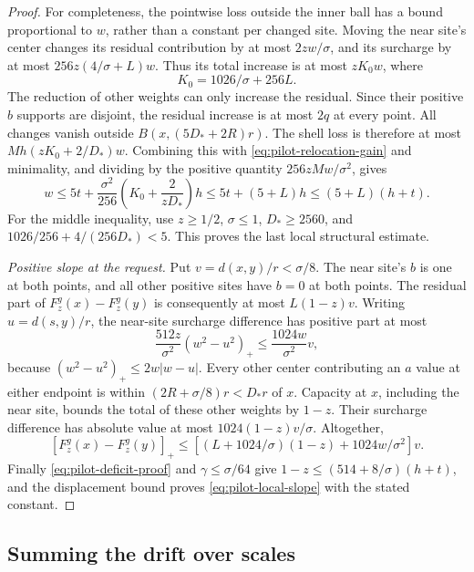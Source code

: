 \begin{proof}
For completeness, the pointwise loss outside the inner ball has a
bound proportional to $w$, rather than a constant per changed site.
Moving the near site's center changes its residual contribution by at
most $2zw/\sigma$, and its surcharge by at most
$256z(4/\sigma+L)w$.  Thus its total increase is at most $zK_0w$, where
\[
 K_0=1026/\sigma+256L.
\]
The reduction of other weights can only increase the residual.  Since
their positive $b$ supports are disjoint, the residual increase is at
most $2q$ at every point.  All changes vanish outside
$B(x,(5D_*+2R)r)$.  The shell loss is therefore at most
$Mh(zK_0+2/D_*)w$.  Combining this with
\eqref{eq:pilot-relocation-gain} and minimality, and dividing by the
positive quantity $256zMw/\sigma^2$, gives
\[
 w\le5t+\frac{\sigma^2}{256}
                   \left(K_0+\frac{2}{zD_*}\right)h
   \le5t+(5+L)h\le(5+L)(h+t).
\]
For the middle inequality, use $z\ge1/2$, $\sigma\le1$,
$D_*\ge2560$, and
$1026/256+4/(256D_*)<5$.  This proves the last local structural estimate.

\emph{Positive slope at the request.}
Put $v=d(x,y)/r<\sigma/8$.  The near site's $b$ is one at both points,
and all other positive sites have $b=0$ at both points.  The residual
part of $F_z^g(x)-F_z^g(y)$ is consequently at most $L(1-z)v$.
Writing $u=d(s,y)/r$, the near-site surcharge difference has positive
part at most
\[
 \frac{512z}{\sigma^2}(w^2-u^2)_+
 \le\frac{1024w}{\sigma^2}v,
\]
because $(w^2-u^2)_+\le2w|w-u|$.
Every other center contributing an $a$ value at either endpoint is
within $(2R+\sigma/8)r<D_*r$ of $x$.  Capacity at $x$, including the
near site, bounds the total of these other weights by $1-z$.
Their surcharge difference has absolute value at most
$1024(1-z)v/\sigma$.  Altogether,
\[
 [F_z^g(x)-F_z^g(y)]_+
 \le\left[(L+1024/\sigma)(1-z)
              +1024w/\sigma^2\right]v.
\]
Finally \eqref{eq:pilot-deficit-proof} and $\gamma\le\sigma/64$ give
$1-z\le(514+8/\sigma)(h+t)$, and the displacement bound proves
\eqref{eq:pilot-local-slope} with the stated constant.
\end{proof}

\subsection{Summing the drift over scales}

